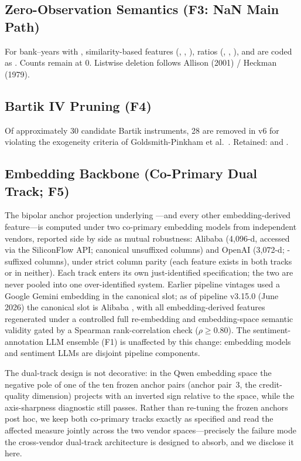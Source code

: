 \subsection{Zero-Observation Semantics (F3: NaN Main Path)}
For bank--years with , similarity-based features
(, , ),
ratios (, ,
), and  are coded
as . Counts remain at 0. Listwise deletion follows Allison
(2001) / Heckman (1979).

\subsection{Bartik IV Pruning (F4)}
Of approximately 30 candidate Bartik instruments, 28 are removed in v6
for violating the exogeneity criteria of Goldsmith-Pinkham et
al.\ \parencite{goldsmith2020bartik}. Retained: 
and .

\subsection{Embedding Backbone (Co-Primary Dual Track; F5)}
The bipolar anchor projection underlying
---and every other embedding-derived
feature---is computed under two co-primary embedding models from
independent vendors, reported side by side as mutual robustness:
Alibaba  (4{,}096-d, accessed via the
SiliconFlow API; canonical unsuffixed columns) and OpenAI
 (3{,}072-d; -suffixed
columns), under strict column parity (each feature exists in both
tracks or in neither). Each track enters its own just-identified
specification; the two are never pooled into one over-identified
system. Earlier pipeline vintages used a Google Gemini embedding in
the canonical slot; as of pipeline v3.15.0 (June 2026) the canonical
slot is Alibaba , with all embedding-derived
features regenerated under a controlled full re-embedding and
embedding-space semantic validity gated by a Spearman
rank-correlation check ($\rho \geq 0.80$). The sentiment-annotation
LLM ensemble (F1) is unaffected by this change: embedding models and
sentiment LLMs are disjoint pipeline components.

The dual-track design is not decorative: in the Qwen embedding space
the negative pole of one of the ten frozen anchor pairs (anchor
pair~3, the credit-quality dimension) projects with an inverted sign
relative to the 
space, while the axis-sharpness diagnostic still passes. Rather than
re-tuning the frozen anchors post hoc, we keep both co-primary tracks
exactly as specified and read the affected measure jointly across the
two vendor spaces---precisely the failure mode the cross-vendor
dual-track architecture is designed to absorb, and we disclose it
here.

